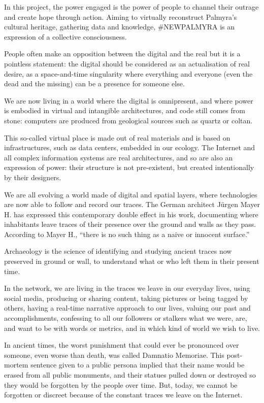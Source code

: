 In this project, the power engaged is the power of people to channel
their outrage and create hope through action. Aiming to virtually
reconstruct Palmyra's cultural heritage, gathering data and knowledge,
\#NEWPALMYRA is an expression of a collective consciousness.

People often make an opposition between the digital and the real but it
is a pointless statement: the digital should be considered as an
actualisation of real desire, as a space-and-time singularity where
everything and everyone (even the dead and the missing) can be a
presence for someone else.

We are now living in a world where the digital is omnipresent, and where
power is embodied in virtual and intangible architectures, and code
still comes from stone: computers are produced from geological sources
such as quartz or coltan.

This so-called virtual place is made out of real materials and is based
on infrastructures, such as data centers, embedded in our ecology. The
Internet and all complex information systems are real architectures, and
so are also an expression of power: their structure is not pre-existent,
but created intentionally by their designers.

We are all evolving a world made of digital and spatial layers, where
technologies are now able to follow and record our traces. The German
architect Jürgen Mayer H. has expressed this contemporary double effect
in his work, documenting where inhabitants leave traces of their
presence over the ground and walls as they pass. According to Mayer H.,
``there is no such thing as a naive or innocent surface.''

Archaeology is the science of identifying and studying ancient traces
now preserved in ground or wall, to understand what or who left them in
their present time.

In the network, we are living in the traces we leave in our everyday
lives, using social media, producing or sharing content, taking pictures
or being tagged by others, having a real-time narrative approach to our
lives, valuing our past and accomplishments, confessing to all our
followers or stalkers what we were, are, and want to be with words or
metrics, and in which kind of world we wish to live.

In ancient times, the worst punishment that could ever be pronounced
over someone, even worse than death, was called Damnatio Memoriae. This
post-mortem sentence given to a public persona implied that their name
would be erased from all public monuments, and their statues pulled down
or destroyed so they would be forgotten by the people over time. But,
today, we cannot be forgotten or discreet because of the constant traces
we leave on the Internet.

